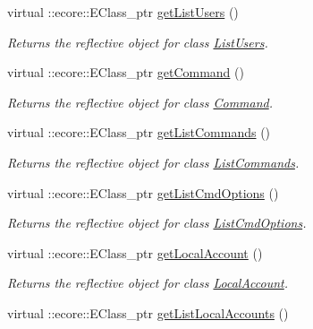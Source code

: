 \begin{DoxyCompactItemize}
virtual ::ecore::EClass\_\-ptr \hyperlink{classUMS__Data_1_1UMS__DataPackage_a8a703751beb29979822452e5693a483c}{getListUsers} ()
\begin{DoxyCompactList}\small\item\em Returns the reflective object for class \hyperlink{classUMS__Data_1_1ListUsers}{ListUsers}. \item\end{DoxyCompactList}\item 
virtual ::ecore::EClass\_\-ptr \hyperlink{classUMS__Data_1_1UMS__DataPackage_acb08762ef056418e3174dcca725b3c2d}{getCommand} ()
\begin{DoxyCompactList}\small\item\em Returns the reflective object for class \hyperlink{classUMS__Data_1_1Command}{Command}. \item\end{DoxyCompactList}\item 
virtual ::ecore::EClass\_\-ptr \hyperlink{classUMS__Data_1_1UMS__DataPackage_a7ebf8946a6d1dc9b73a92c0648ec0614}{getListCommands} ()
\begin{DoxyCompactList}\small\item\em Returns the reflective object for class \hyperlink{classUMS__Data_1_1ListCommands}{ListCommands}. \item\end{DoxyCompactList}\item 
virtual ::ecore::EClass\_\-ptr \hyperlink{classUMS__Data_1_1UMS__DataPackage_a0558af951c71b7e9124841585f1e8dcf}{getListCmdOptions} ()
\begin{DoxyCompactList}\small\item\em Returns the reflective object for class \hyperlink{classUMS__Data_1_1ListCmdOptions}{ListCmdOptions}. \item\end{DoxyCompactList}\item 
virtual ::ecore::EClass\_\-ptr \hyperlink{classUMS__Data_1_1UMS__DataPackage_ae784a8a61e3e1ae1e5568c784c6c1fff}{getLocalAccount} ()
\begin{DoxyCompactList}\small\item\em Returns the reflective object for class \hyperlink{classUMS__Data_1_1LocalAccount}{LocalAccount}. \item\end{DoxyCompactList}\item 
virtual ::ecore::EClass\_\-ptr \hyperlink{classUMS__Data_1_1UMS__DataPackage_a83591ce14b6a7cec39aadeffd44845f9}{getListLocalAccounts} ()

\end{DoxyCompactItemize}
